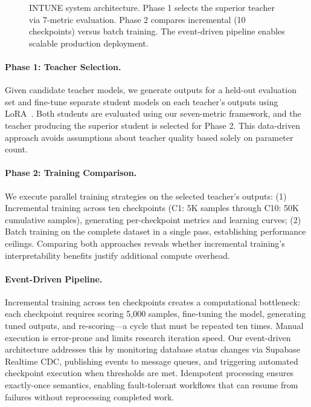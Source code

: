 \documentclass[sigconf]{acmart}
\begin{document}
\begin{figure}[t]
\caption{INTUNE system architecture. Phase 1 selects the superior teacher via 7-metric evaluation. Phase 2 compares incremental (10 checkpoints) versus batch training. The event-driven pipeline enables scalable production deployment.}
\label{fig:architecture}
\end{figure}

\paragraph{Phase 1: Teacher Selection.}
Given candidate teacher models, we generate outputs for a held-out evaluation set and fine-tune separate student models on each teacher's outputs using LoRA~\cite{hu2022lora}. Both students are evaluated using our seven-metric framework, and the teacher producing the superior student is selected for Phase 2. This data-driven approach avoids assumptions about teacher quality based solely on parameter count.

\paragraph{Phase 2: Training Comparison.}
We execute parallel training strategies on the selected teacher's outputs: (1) Incremental training across ten checkpoints (C1: 5K samples through C10: 50K cumulative samples), generating per-checkpoint metrics and learning curves; (2) Batch training on the complete dataset in a single pass, establishing performance ceilings. Comparing both approaches reveals whether incremental training's interpretability benefits justify additional compute overhead.

\paragraph{Event-Driven Pipeline.}
Incremental training across ten checkpoints creates a computational bottleneck: each checkpoint requires scoring 5,000 samples, fine-tuning the model, generating tuned outputs, and re-scoring---a cycle that must be repeated ten times. Manual execution is error-prone and limits research iteration speed. Our event-driven architecture addresses this by monitoring database status changes via Supabase Realtime CDC, publishing events to message queues, and triggering automated checkpoint execution when thresholds are met. Idempotent processing ensures exactly-once semantics, enabling fault-tolerant workflows that can resume from failures without reprocessing completed work.
\end{document}
